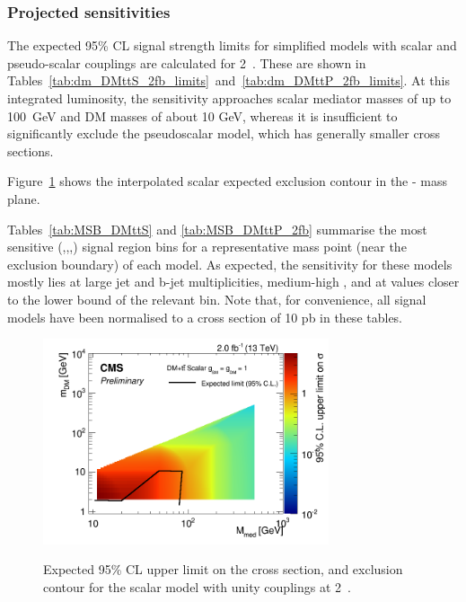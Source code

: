\clearpage 

 
\clearpage


\subsubsection{Projected sensitivities}

The expected 95\% CL signal strength limits for simplified \DMtt models with scalar and
pseudo-scalar couplings are calculated for 2~\ifb. These are shown in
Tables~\ref{tab:dm_DMttS_2fb_limits}~and~\ref{tab:dm_DMttP_2fb_limits}. At this
integrated luminosity, the sensitivity approaches scalar mediator masses of up 
to 100~GeV and DM masses of about 10 GeV, whereas it is insufficient to
significantly exclude the pseudoscalar model, which has generally smaller cross
sections.

Figure~\ref{fig:dm_DMttS_2fb_2dlimits} shows the interpolated scalar expected 
exclusion contour in the {\mphi-\mchi} mass plane.

Tables~\ref{tab:MSB_DMttS} and \ref{tab:MSB_DMttP_2fb} summarise the most sensitive 
{(\njet,\nb,\scalht,\mht)} signal region
bins for a representative mass point (near the exclusion boundary) of each \DMtt
model. As expected, the sensitivity for these models mostly lies at large jet and b-jet
multiplicities, medium-high \scalht, and at \mht values closer to the lower bound
of the relevant \scalht bin. Note that, for convenience, all signal models have
been normalised to a cross section of 10 pb in these tables.


\clearpage


\clearpage

\begin{figure}
\begin{center}
\includegraphics[width=0.75\textwidth]{figures/DMplots/dm_DMttS_2p0fb_2dlimits} \\
\caption{Expected 95\% CL upper limit on the cross section, and exclusion
contour for the scalar \DMtt model with unity couplings at 2~\ifb.}
\label{fig:dm_DMttS_2fb_2dlimits}
\end{center}
\end{figure}

